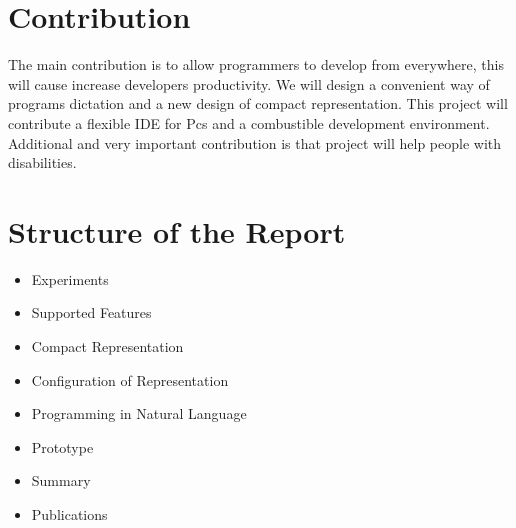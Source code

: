 \section{Contribution}
The main contribution is to allow programmers to develop from everywhere, this will cause increase developers productivity. We will design  a convenient way of programs dictation and a new design of compact representation. This project will contribute a flexible IDE for Pcs and a combustible development environment. Additional and very important contribution is that project will help people with disabilities.
\section{Structure of the Report}
\begin{itemize}
	\item Experiments
	\item Supported Features
	\item Compact Representation
	\item Configuration of Representation
	\item Programming in Natural Language
	\item Prototype
	\item Summary
	\item Publications
\end{itemize}